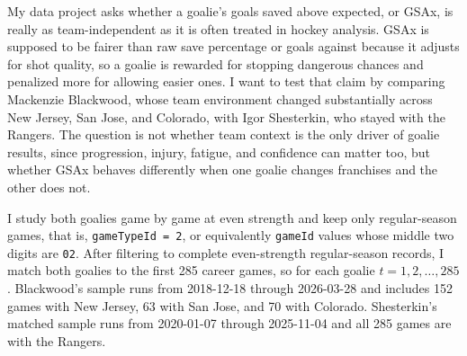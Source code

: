 \documentclass[
  10pt,
]{extarticle}
\newenvironment{Shaded}{\begin{snugshade}}{\end{snugshade}}
\newcommand{\CommentTok}[1]{\textcolor[rgb]{0.56,0.35,0.01}{\textit{#1}}}
\newcommand{\DecValTok}[1]{\textcolor[rgb]{0.00,0.00,0.81}{#1}}
\newcommand{\FunctionTok}[1]{\textcolor[rgb]{0.13,0.29,0.53}{\textbf{#1}}}
\newcommand{\NormalTok}[1]{#1}
\newcommand{\OtherTok}[1]{\textcolor[rgb]{0.56,0.35,0.01}{#1}}
\newcommand{\SpecialCharTok}[1]{\textcolor[rgb]{0.81,0.36,0.00}{\textbf{#1}}}
\newcommand{\StringTok}[1]{\textcolor[rgb]{0.31,0.60,0.02}{#1}}
\begin{document}
\begin{Shaded}
\end{Shaded}

My data project asks whether a goalie's goals saved above expected, or GSAx, is really as team-independent as it is often treated in hockey analysis. GSAx is supposed to be fairer than raw save percentage or goals against because it adjusts for shot quality, so a goalie is rewarded for stopping dangerous chances and penalized more for allowing easier ones. I want to test that claim by comparing Mackenzie Blackwood, whose team environment changed substantially across New Jersey, San Jose, and Colorado, with Igor Shesterkin, who stayed with the Rangers. The question is not whether team context is the only driver of goalie results, since progression, injury, fatigue, and confidence can matter too, but whether GSAx behaves differently when one goalie changes franchises and the other does not.

I study both goalies game by game at even strength and keep only regular-season games, that is, \texttt{gameTypeId\ =\ 2}, or equivalently \texttt{gameId} values whose middle two digits are \texttt{02}. After filtering to complete even-strength regular-season records, I match both goalies to the first 285 career games, so for each goalie \(t = 1, 2, \ldots, 285\). Blackwood's sample runs from 2018-12-18 through 2026-03-28 and includes 152 games with New Jersey, 63 with San Jose, and 70 with Colorado. Shesterkin's matched sample runs from 2020-01-07 through 2025-11-04 and all 285 games are with the Rangers.
\end{document}
